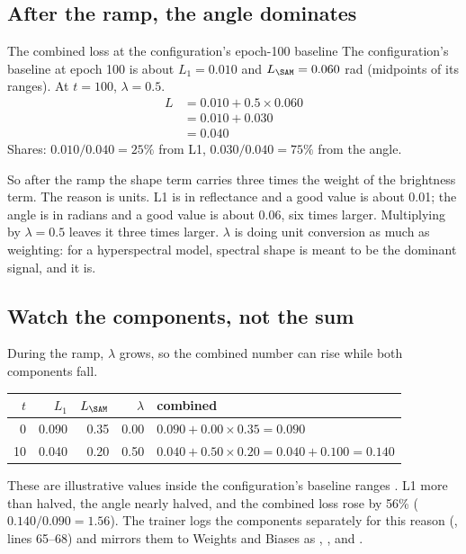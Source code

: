 
\subsection{After the ramp, the angle dominates}

\begin{worked}[label={we:losses:combined}]{The combined loss at the configuration's epoch-100 baseline}
The configuration's baseline at epoch 100 is about $L_1 = 0.010$ and $L_{\SAM} = 0.060$
rad  (midpoints of its ranges). At $t = 100$,
$\lambda = 0.5$.
\begin{align*}
L &= 0.010 + 0.5 \times 0.060\\
&= 0.010 + 0.030\\
&= 0.040
\end{align*}
Shares: $0.010/0.040 = 25\%$ from L1, $0.030/0.040 = 75\%$ from the angle.
\end{worked}

So after the ramp the shape term carries three times the weight of the brightness term. The
reason is units. L1 is in reflectance and a good value is about 0.01; the angle is in radians
and a good value is about 0.06, six times larger. Multiplying by $\lambda = 0.5$ leaves it three
times larger. $\lambda$ is doing unit conversion as much as weighting: for a hyperspectral model,
spectral shape is meant to be the dominant signal, and it is.

\subsection{Watch the components, not the sum}

During the ramp, $\lambda$ grows, so the combined number can rise while both components fall.
\begin{center}
\begin{tabular}{rrrrl}
\toprule
$t$ & $L_1$ & $L_{\SAM}$ & $\lambda$ & combined\\
\midrule
0 & 0.090 & 0.35 & 0.00 & $0.090 + 0.00 \times 0.35 = 0.090$\\
10 & 0.040 & 0.20 & 0.50 & $0.040 + 0.50 \times 0.20 = 0.040 + 0.100 = 0.140$\\
\bottomrule
\end{tabular}
\end{center}
These are illustrative values inside the configuration's baseline
ranges \tagA. L1 more than halved, the angle nearly halved, and the combined loss rose by
56\% ($0.140/0.090 = 1.56$). The trainer logs the components separately for this reason
(, lines 65--68) and mirrors them to Weights
and Biases as , ,  and
.

